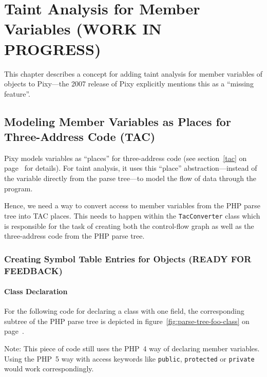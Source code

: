 \chapter{Taint Analysis for Member Variables (WORK IN PROGRESS)}
\label{field-tainting}

This chapter describes a concept for adding taint analysis for member variables of objects to Pixy---the 2007 release of Pixy explicitly mentions this as a ``missing feature''.

\section{Modeling Member Variables as Places for Three-Address Code (TAC)}

Pixy models variables as ``places'' for three-address code (see section~\ref{tac} on page~\pageref{tac} for details). For taint analysis, it uses this ``place'' abstraction---instead of the variable directly from the parse tree---to model the flow of data through the program.

Hence, we need a way to convert access to member variables from the PHP parse tree into TAC places. This needs to happen within the \texttt{TacConverter} class which is responsible for the task of creating both the control-flow graph as well as the three-address code from the PHP parse tree.



\subsection{Creating Symbol Table Entries for Objects (READY FOR FEEDBACK)}

\subsubsection{Class Declaration}

For the following code for declaring a class with one field, the corresponding subtree of the PHP parse tree is depicted in figure~\ref{fig:parse-tree-foo-class} on page~\pageref{fig:parse-tree-foo-class}.


Note: This piece of code still uses the PHP~4 way of declaring member variables. Using the PHP~5 way with access keywords like \texttt{public}, \texttt{protected} or \texttt{private} would work correspondingly.

